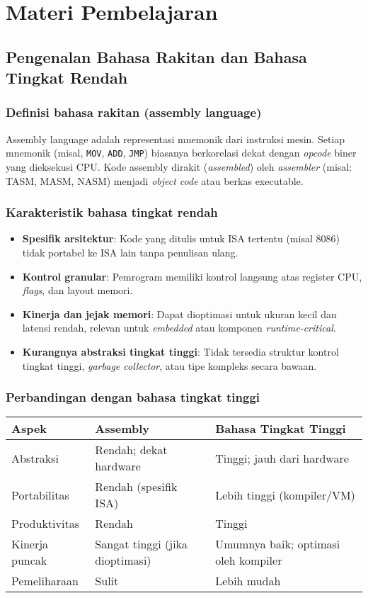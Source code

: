 \section{Materi Pembelajaran}
\subsection{Pengenalan Bahasa Rakitan dan Bahasa Tingkat Rendah}
\subsubsection{Definisi bahasa rakitan (assembly language)}
Assembly language adalah representasi mnemonik dari instruksi mesin. Setiap mnemonik (misal, \texttt{MOV}, \texttt{ADD}, \texttt{JMP}) biasanya berkorelasi dekat dengan \textit{opcode} biner yang dieksekusi CPU. Kode assembly dirakit (\textit{assembled}) oleh \textit{assembler} (misal: TASM, MASM, NASM) menjadi \textit{object code} atau berkas executable.

\subsubsection{Karakteristik bahasa tingkat rendah}
\begin{itemize}
  \item \textbf{Spesifik arsitektur}: Kode yang ditulis untuk ISA tertentu (misal 8086) tidak portabel ke ISA lain tanpa penulisan ulang.
  \item \textbf{Kontrol granular}: Pemrogram memiliki kontrol langsung atas register CPU, \textit{flags}, dan layout memori.
  \item \textbf{Kinerja dan jejak memori}: Dapat dioptimasi untuk ukuran kecil dan latensi rendah, relevan untuk \textit{embedded} atau komponen \textit{runtime-critical}.
  \item \textbf{Kurangnya abstraksi tingkat tinggi}: Tidak tersedia struktur kontrol tingkat tinggi, \textit{garbage collector}, atau tipe kompleks secara bawaan.
\end{itemize}

\subsubsection{Perbandingan dengan bahasa tingkat tinggi}
\begin{center}
\begin{tabular}{p{} p{} p{}}
\hline
\textbf{Aspek} & \textbf{Assembly} & \textbf{Bahasa Tingkat Tinggi} \\
\hline
Abstraksi & Rendah; dekat hardware & Tinggi; jauh dari hardware \\
Portabilitas & Rendah (spesifik ISA) & Lebih tinggi (kompiler/VM) \\
Produktivitas & Rendah & Tinggi \\
Kinerja puncak & Sangat tinggi (jika dioptimasi) & Umumnya baik; optimasi oleh kompiler \\
Pemeliharaan & Sulit & Lebih mudah \\
\hline
\end{tabular}
\end{center}

